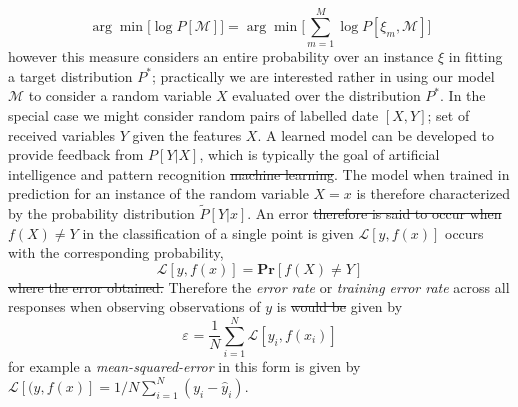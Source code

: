 \documentclass[7pt]{article}
\begin{document}
	\begin{equation}
	 \arg \min \Biggr[  \log P[\mathcal{M}] \Biggl] =  \arg \min \Biggr[ \sum_{m=1}^M \log P[\xi_m,\mathcal{M}] \Biggl] 
	\end{equation}
however  this measure considers an entire probability over an instance $\xi$ in fitting a target distribution ${P}^*$; practically we are interested rather in using our model $\mathcal{M}$ to consider a random variable $X$ evaluated over the distribution ${{P}^*}$.  In the special case we might consider random pairs of labelled date $[X,Y]$; set of received variables $Y$ given the features $X$.  A learned model can be developed to provide feedback from $P[Y | X]$, which is typically the goal of artificial intelligence and pattern recognition \st{machine learning}. The model when trained in prediction for an instance of the random variable $X=x$ is therefore characterized by the  probability distribution $\tilde{P}[Y | x]$. An error \st{therefore  is said to occur when} $f(X) \neq Y$  in the classification of a single point is given $\mathcal{L}[ y, f(x)]$ occurs with the corresponding probability,
	\begin{equation*}
	\mathcal{L}[ y, f(x)] = \mathbf{Pr}[f(X) \neq Y]
	\end{equation*}
\st{where the error obtained.} Therefore the \emph{error rate} or \emph{training error rate} across all responses when observing observations of $y$ is \st{would be} given by
	\begin{equation*}
	\varepsilon_{} = \dfrac{1}{N} \sum_{i=1}^{N} \mathcal{L} [ y_i, f(x_i) ]
	\end{equation*}
for example a \emph{mean-squared-error} in this form is given by $\mathcal{L} [ (y, f(x) ] = 1/N \sum_{i=1}^{N} (y_i - \hat{y}_i)$. 


\end{document}
